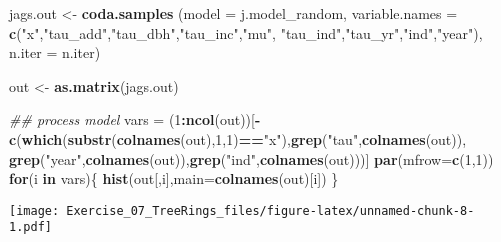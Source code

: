 \documentclass[]{article}
\newenvironment{Shaded}{\begin{snugshade}}{\end{snugshade}}
\newcommand{\CommentTok}[1]{\textcolor[rgb]{0.56,0.35,0.01}{\textit{#1}}}
\newcommand{\ControlFlowTok}[1]{\textcolor[rgb]{0.13,0.29,0.53}{\textbf{#1}}}
\newcommand{\DataTypeTok}[1]{\textcolor[rgb]{0.13,0.29,0.53}{#1}}
\newcommand{\DecValTok}[1]{\textcolor[rgb]{0.00,0.00,0.81}{#1}}
\newcommand{\KeywordTok}[1]{\textcolor[rgb]{0.13,0.29,0.53}{\textbf{#1}}}
\newcommand{\NormalTok}[1]{#1}
\newcommand{\OperatorTok}[1]{\textcolor[rgb]{0.81,0.36,0.00}{\textbf{#1}}}
\newcommand{\StringTok}[1]{\textcolor[rgb]{0.31,0.60,0.02}{#1}}
\begin{document}
\begin{Shaded}
\begin{Highlighting}[]
\NormalTok{jags.out   <-}\StringTok{ }\KeywordTok{coda.samples}\NormalTok{ (}\DataTypeTok{model =}\NormalTok{ j.model_random,}
                              \DataTypeTok{variable.names =} \KeywordTok{c}\NormalTok{(}\StringTok{"x"}\NormalTok{,}\StringTok{"tau_add"}\NormalTok{,}\StringTok{"tau_dbh"}\NormalTok{,}\StringTok{"tau_inc"}\NormalTok{,}\StringTok{"mu"}\NormalTok{,}
                                                 \StringTok{"tau_ind"}\NormalTok{,}\StringTok{"tau_yr"}\NormalTok{,}\StringTok{"ind"}\NormalTok{,}\StringTok{"year"}\NormalTok{),}
                              \DataTypeTok{n.iter =}\NormalTok{ n.iter)}

\NormalTok{out <-}\StringTok{ }\KeywordTok{as.matrix}\NormalTok{(jags.out)}
\end{Highlighting}
\end{Shaded}

\begin{Shaded}
\begin{Highlighting}[]
\CommentTok{## process model}
\NormalTok{  vars =}\StringTok{ }\NormalTok{(}\DecValTok{1}\OperatorTok{:}\KeywordTok{ncol}\NormalTok{(out))[}\OperatorTok{-}\KeywordTok{c}\NormalTok{(}\KeywordTok{which}\NormalTok{(}\KeywordTok{substr}\NormalTok{(}\KeywordTok{colnames}\NormalTok{(out),}\DecValTok{1}\NormalTok{,}\DecValTok{1}\NormalTok{)}\OperatorTok{==}\StringTok{"x"}\NormalTok{),}\KeywordTok{grep}\NormalTok{(}\StringTok{"tau"}\NormalTok{,}\KeywordTok{colnames}\NormalTok{(out)),}
                          \KeywordTok{grep}\NormalTok{(}\StringTok{"year"}\NormalTok{,}\KeywordTok{colnames}\NormalTok{(out)),}\KeywordTok{grep}\NormalTok{(}\StringTok{"ind"}\NormalTok{,}\KeywordTok{colnames}\NormalTok{(out)))]}
  \KeywordTok{par}\NormalTok{(}\DataTypeTok{mfrow=}\KeywordTok{c}\NormalTok{(}\DecValTok{1}\NormalTok{,}\DecValTok{1}\NormalTok{))}
  \ControlFlowTok{for}\NormalTok{(i }\ControlFlowTok{in}\NormalTok{ vars)\{}
    \KeywordTok{hist}\NormalTok{(out[,i],}\DataTypeTok{main=}\KeywordTok{colnames}\NormalTok{(out)[i])}
\NormalTok{  \}}
\end{Highlighting}
\end{Shaded}

\texttt{[image: Exercise\_07\_TreeRings\_files/figure-latex/unnamed-chunk-8-1.pdf]}
\end{document}
